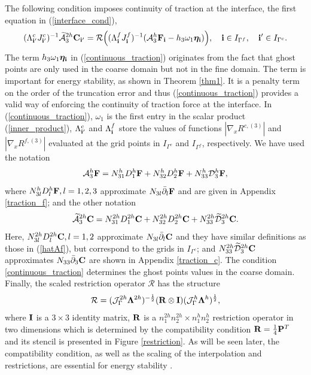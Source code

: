 The following condition imposes continuity of traction at the interface, the first equation in (\ref{interface_cond}),
\begin{equation}\label{continuous_traction}
(\Lambda^{c}_{{\bf i}'}J_{{\bf i}'}^{c})^{-1}\wt{\mathcal{A}}_3^{2h}{\bf C}_{{\bf i}'}
= {\mathcal{R}}\Big((\Lambda^f_{\bf i}{ J}^f_{\bf i})^{-1}(\mathcal{A}_3^h{\bf F}_{\bf i}-h_3\omega_1{\bm \eta}_{\bf i})\Big), \quad {\bf i}\in I_{\Gamma^f},\quad {{\bf i}'}\in I_{\Gamma^c}.
\end{equation}
The term $h_3\omega_1{\bm \eta}_{\bf i}$ in (\ref{continuous_traction}) originates from the fact that ghost points are only used in the coarse domain but not in the fine domain. The term is important for energy stability, as shown in Theorem \ref{thm1}. It is a penalty term on the order of the truncation error and thus (\ref{continuous_traction})  provides a valid way of enforcing the continuity of traction force at the interface.  In (\ref{continuous_traction}), $\omega_1$ is the first entry in the scalar product (\ref{inner_product}), $\Lambda_{{\bf i}'}^c$ and $\Lambda_{\bf i}^f$ store the values of functions $|\nabla_x R^{c,(3)}|$ and $|\nabla_x R^{f,(3)}|$ evaluated at the grid points in $I_{\Gamma^c}$ and $I_{\Gamma^f}$, respectively. We have used the notation
\begin{equation}\label{hatAf}
\mathcal{A}_3^h{\bf F} = {N}_{31}^{h}{D}^h_1{\bf F} + {N}_{32}^h{D}^h_2{\bf F} + {N}_{33}^h\mathcal{D}_3^h{\bf F},
\end{equation}
where ${N}_{3l}^hD_l^h{\bf F}, l = 1,2,3$ approximate $N_{3l}\bar{\partial}_l{\bf F}$ and are given in Appendix \ref{traction_f}; and the other notation 
\begin{equation}\label{hatAc}
\wt{\mathcal{A}}_3^{2h}{\bf C} = {N}_{31}^{2h}{D}^{2h}_1{\bf C} + {N}_{32}^{2h}{D}^{2h}_2{\bf C} + {N}_{33}^{2h}\wt{\mathcal{D}}^{2h}_3{\bf C}.
\end{equation}
Here, ${N}_{3l}^{2h}D_l^{2h}{\bf C}, l = 1,2$ approximate $N_{3l}\bar{\partial}_l{\bf C}$ and they have similar definitions as those in (\ref{hatAf}), but correspond to the grids in $I_{\Gamma^c}$; and ${N}_{33}^{2h}\widetilde{\mathcal{D}}^{2h}_3{\bf C}$ approximates $N_{33}\bar{\partial}_3{\bf C}$ are shown in Appendix \ref{traction_c}. The condition \eqref{continuous_traction} determines the ghost points values in the coarse domain. Finally, the scaled restriction operator ${\mathcal{R}} $ has the structure 
 \[{\mathcal{R}} =  (\mathcal{J}^{2h}_\Gamma \bm{\Lambda}^{2h})^{-\frac{1}{2}}({\bf R}\otimes{\bf I})(\mathcal{J}^{h}_\Gamma \bm{\Lambda}^h)^{\frac{1}{2}},\]
 where ${\bf I}$ is a $3\times3$ identity matrix, ${\bf R}$ is a $n_1^{2h}n_2^{2h}\times n_1^hn_2^h$ restriction operator in two dimensions which is determined by the compatibility condition ${\bf R}=\frac{1}{4}{\bf P}^T$ and its stencil is presented in Figure \ref{restriction}. As will be seen later, the compatibility condition, as well as the scaling of the interpolation and restrictions, are essential for energy stability \cite{Lundquist2018}.

